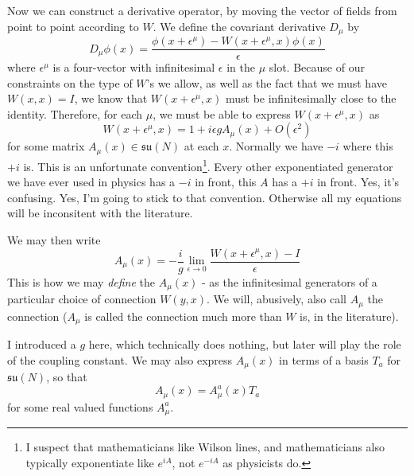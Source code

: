 \documentclass[main.tex]{subfiles}
\begin{document}
Now we can construct a derivative operator, by moving the vector of fields from point to point according to $W$. We define the covariant derivative $D_\mu$ by
\begin{equation} \label{Dmu1}
D_\mu \phi (x)= \frac{\phi(x + \epsilon^\mu) - W(x + \epsilon^\mu,x) \phi(x)}{\epsilon}
\end{equation}
where $\epsilon^\mu$ is a four-vector with infinitesimal $\epsilon$ in the $\mu$ slot. Because of our constraints on the type of $W$'s we allow, as well as the fact that we must have $W(x,x) = I$, we know that $W(x + \epsilon^\mu,x)$ must be infinitesimally close to the identity. Therefore, for each $\mu$, we must be able to express $W(x+\epsilon^\mu,x)$ as 
\begin{equation} \label{inf1}
W(x +\epsilon^\mu,x) = 1 + i \epsilon g A_\mu (x) + O (\epsilon^2)
\end{equation}
for some matrix $A_\mu (x) \in \mathfrak{su}(N)$ at each $x$.  Normally we have $-i$ where this $+i$ is. This is an unfortunate convention\footnote{I suspect that mathematicians like Wilson lines, and mathematicians also typically exponentiate like $e^{i A}$, not $e^{-i A}$ as physicists do.}. Every other exponentiated generator we have ever used in physics has a $-i$ in front, this $A$ has a $+i$ in front. Yes, it's confusing. Yes, I'm going to stick to that convention. Otherwise all my equations will be inconsitent with the literature.

We may then write
\begin{equation} \label{Amu1}
\boxed{A_\mu (x) = - \frac{i}{g} \lim_{\epsilon \to 0} \frac{W(x + \epsilon^\mu,x) - I}{\epsilon}}
\end{equation}
This is how we may \textit{define} the $A_\mu (x)$ - as the infinitesimal generators of a particular choice of connection $W(y,x)$. We will, abusively, also call $A_\mu$ the connection ($A_\mu$ is called the connection much more than $W$ is, in the literature).

I introduced a $g$ here, which technically does nothing, but later will play the role of the coupling constant. We may also express $A_\mu(x)$ in terms of a basis $T_a$ for $\mathfrak{su}(N)$, so that
\[
A_\mu (x) = A^a_\mu (x) T_a
\]
for some real valued functions $A^a_\mu$.
\end{document}
